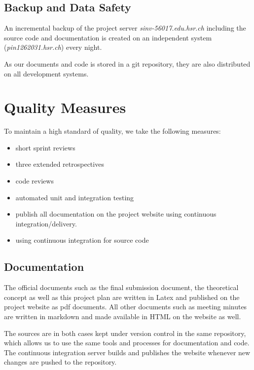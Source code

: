 \documentclass[a4paper]{article}
\begin{document}
\subsection{Backup and Data Safety}

An incremental backup of the project server \textit{sinv-56017.edu.hsr.ch} including the source code and documentation is created on an independent system (\textit{pin1262031.hsr.ch}) every night.

As our documents and code is stored in a git repository, they are also distributed on all development systems.



\section{Quality Measures}
To maintain a high standard of quality, we take the following measures:

\begin{multicols}{2}
	\begin{itemize}
	    \item short sprint reviews
	    \item three extended retrospectives
	    \item code reviews
	    \item automated unit and integration testing
	    \item publish all documentation on the project website using continuous integration/delivery.
	    \item using continuous integration for source code
	\end{itemize}
\end{multicols}

\subsection{Documentation}
The official documents such as the final submission document, the theoretical concept as well as this project plan are written in Latex and published on the project website as pdf documents. All other documents such as meeting minutes are written in markdown and made available in HTML on the website as well.

The sources are in both cases kept under version control in the same repository, which allows us to use the same tools and processes for documentation and code. The continuous integration server builds and publishes the website whenever new changes are pushed to the repository.
\end{document}
